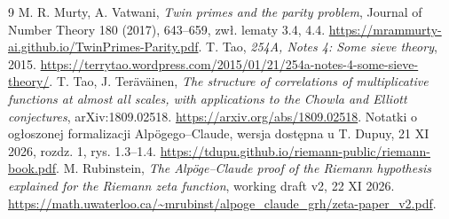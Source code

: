 \documentclass[11pt,a4paper]{article}
\theoremstyle{definition}\newtheorem{defn}[tw]{Definicja}
\theoremstyle{remark}\newtheorem*{uw}{Uwaga}
\begin{document}
\begin{thebibliography}{9}
 M. R. Murty, A. Vatwani, \emph{Twin primes and the parity problem},
Journal of Number Theory 180 (2017), 643--659, zwł. lematy 3.4, 4.4.
\url{https://mrammurty-ai.github.io/TwinPrimes-Parity.pdf}.
 T. Tao, \emph{254A, Notes 4: Some sieve theory}, 2015.
\url{https://terrytao.wordpress.com/2015/01/21/254a-notes-4-some-sieve-theory/}.
 T. Tao, J. Teräväinen, \emph{The structure of correlations of
multiplicative functions at almost all scales, with applications to the
Chowla and Elliott conjectures}, arXiv:1809.02518.
\url{https://arxiv.org/abs/1809.02518}.
 Notatki o ogłoszonej formalizacji Alpögego--Claude,
wersja dostępna u T. Dupuy, 21 XI 2026, rozdz. 1, rys. 1.3--1.4.
\url{https://tdupu.github.io/riemann-public/riemann-book.pdf}.
 M. Rubinstein, \emph{The Alpöge--Claude proof of the Riemann
hypothesis explained for the Riemann zeta function}, working draft v2,
22 XI 2026. \url{https://math.uwaterloo.ca/~mrubinst/alpoge_claude_grh/zeta-paper_v2.pdf}.
\end{thebibliography}
\end{document}
